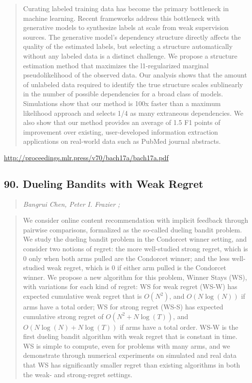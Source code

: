 \documentclass{article}
\begin{document}
\begin{quote}
    Curating labeled training data has become the primary bottleneck in machine learning. Recent frameworks address this bottleneck with generative models to synthesize labels at scale from weak supervision sources. The generative model’s dependency structure directly affects the quality of the estimated labels, but selecting a structure automatically without any labeled data is a distinct challenge. We propose a structure estimation method that maximizes the l1-regularized marginal pseudolikelihood of the observed data. Our analysis shows that the amount of unlabeled data required to identify the true structure scales sublinearly in the number of possible dependencies for a broad class of models. Simulations show that our method is 100x faster than a maximum likelihood approach and selects 1/4 as many extraneous dependencies. We also show that our method provides an average of 1.5 F1 points of improvement over existing, user-developed information extraction applications on real-world data such as PubMed journal abstracts.  
\end{quote}

\href{http://proceedings.mlr.press/v70/bach17a/bach17a.pdf}{http://proceedings.mlr.press/v70/bach17a/bach17a.pdf}

\subsection{90. Dueling Bandits with Weak Regret}

\begin{quote}
\footnotesize{\textit{Bangrui Chen, Peter I. Frazier ;}}

\end{quote}

\begin{quote}
    We consider online content recommendation with implicit feedback through pairwise comparisons, formalized as the so-called dueling bandit problem. We study the dueling bandit problem in the Condorcet winner setting, and consider two notions of regret: the more well-studied strong regret, which is 0 only when both arms pulled are the Condorcet winner; and the less well-studied weak regret, which is 0 if either arm pulled is the Condorcet winner. We propose a new algorithm for this problem, Winner Stays (WS), with variations for each kind of regret: WS for weak regret (WS-W) has expected cumulative weak regret that is $O(N^2)$, and $O(N\log(N))$ if arms have a total order; WS for strong regret (WS-S) has expected cumulative strong regret of $O(N^2 + N \log(T))$, and $O(N\log(N)+N\log(T))$ if arms have a total order. WS-W is the first dueling bandit algorithm with weak regret that is constant in time. WS is simple to compute, even for problems with many arms, and we demonstrate through numerical experiments on simulated and real data that WS has significantly smaller regret than existing algorithms in both the weak- and strong-regret settings.  
\end{quote}
\end{document}
